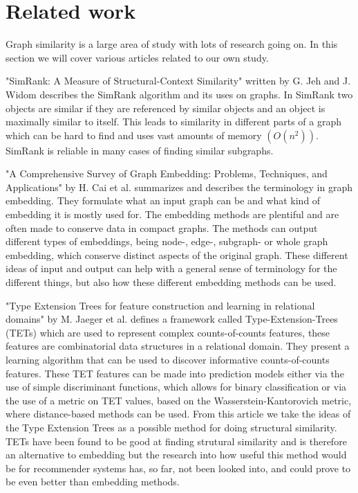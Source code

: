 \section{Related work}
\label{sec:Related_work}
Graph similarity is a large area of study with lots of research going on. In this section we will cover various articles related to our own study.

"SimRank: A Measure of Structural-Context Similarity" written by G. Jeh and J. Widom\cite{10.1145/775047.775126} describes the SimRank algorithm and its uses on graphs. 
In SimRank two objects are similar if they are referenced by similar objects and an object is maximally similar to itself. 
This leads to similarity in different parts of a graph which can be hard to find and uses vast amounts of memory $(O(n^2))$. SimRank is reliable in many cases of finding similar subgraphs.

"A Comprehensive Survey of Graph Embedding: Problems, Techniques, and Applications" by H. Cai et al.\cite{8294302} summarizes and describes the terminology in graph embedding. 
They formulate what an input graph can be and what kind of embedding it is mostly used for.
 The embedding methods are plentiful and are often made to conserve data in compact graphs. 
The methods can output different types of embeddings, being node-, edge-, subgraph- or whole graph embedding, which conserve distinct aspects of the original graph. 
These different ideas of input and output can help with a general sense of terminology for the different things, but also how these different embedding methods can be used.

"Type Extension Trees for feature construction and learning in relational domains" by M. Jaeger et al. \cite{JAEGER201330} defines a framework called Type-Extension-Trees (TETs) which are used to represent complex counts-of-counts features, these features are combinatorial data structures in a relational domain. 
They present a learning algorithm that can be used to discover informative counts-of-counts features. 
These TET features can be made into prediction models either via the use of simple discriminant functions, which allows for binary classification or via the use of a metric on TET values, based on the Wasserstein-Kantorovich metric, where distance-based methods can be used. From this article we take the ideas of the Type Extension Trees as a possible method for doing structural similarity.
TETs have been found to be good at finding strutural similarity and is therefore an alternative to embedding but the research into how useful this method would be for recommender systems has, so far, not been looked into, and could prove to be even better than embedding methods.

